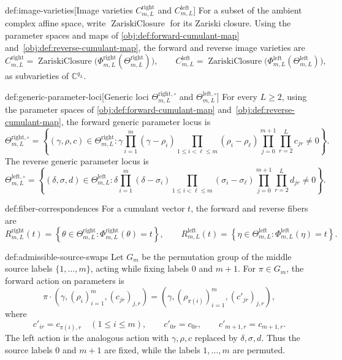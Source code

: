 \begin{definitionv}{def:image-varieties}[Image varieties \(C^{\mathrm{right}}_{m,L}\) and \(C^{\mathrm{left}}_{m,L}\)]
For a subset of the ambient complex affine space, write \(\operatorname{ZariskiClosure}\) for its Zariski closure. Using the parameter spaces and maps of \cref{obj:def:forward-cumulant-map} and~\cref{obj:def:reverse-cumulant-map}, the forward and reverse image varieties are
\[
C^{\mathrm{right}}_{m,L}
=
\operatorname{ZariskiClosure}
\bigl(\Phi^{\mathrm{right}}_{m,L}(\Theta^{\mathrm{right}}_{m,L})\bigr),
\qquad
C^{\mathrm{left}}_{m,L}
=
\operatorname{ZariskiClosure}
\bigl(\Phi^{\mathrm{left}}_{m,L}(\Theta^{\mathrm{left}}_{m,L})\bigr),
\]
as subvarieties of \(\mathbb C^{q_L}\).
\end{definitionv}

\begin{definitionv}{def:generic-parameter-loci}[Generic loci \(\Theta^{\mathrm{right},\circ}_{m,L}\) and \(\Theta^{\mathrm{left},\circ}_{m,L}\)]
For every \(L\ge2\), using the parameter spaces of \cref{obj:def:forward-cumulant-map} and~\cref{obj:def:reverse-cumulant-map}, the forward generic parameter locus is
\[
\Theta^{\mathrm{right},\circ}_{m,L}
=
\left\{
(\gamma,\rho,c)\in \Theta^{\mathrm{right}}_{m,L}:
\gamma
\prod_{i=1}^m(\gamma-\rho_i)
\prod_{1\le i<\ell\le m}(\rho_i-\rho_\ell)
\prod_{j=0}^{m+1}\prod_{r=2}^L c_{jr}
\ne 0
\right\}.
\]
The reverse generic parameter locus is
\[
\Theta^{\mathrm{left},\circ}_{m,L}
=
\left\{
(\delta,\sigma,d)\in \Theta^{\mathrm{left}}_{m,L}:
\delta
\prod_{i=1}^m(\delta-\sigma_i)
\prod_{1\le i<\ell\le m}(\sigma_i-\sigma_\ell)
\prod_{j=0}^{m+1}\prod_{r=2}^L d_{jr}
\ne 0
\right\}.
\]
\end{definitionv}

\begin{definitionv}{def:fiber-correspondences}
For a cumulant vector \(t\), the forward and reverse fibers are
\[
R^{\mathrm{right}}_{m,L}(t)
=
\left\{
\theta\in \Theta^{\mathrm{right}}_{m,L}:
\Phi^{\mathrm{right}}_{m,L}(\theta)=t
\right\},
\qquad
R^{\mathrm{left}}_{m,L}(t)
=
\left\{
\eta\in \Theta^{\mathrm{left}}_{m,L}:
\Phi^{\mathrm{left}}_{m,L}(\eta)=t
\right\}.
\]
\end{definitionv}

\begin{definitionv}{def:admissible-source-swaps}
Let \(G_m\) be the permutation group of the middle source labels \(\{1,\ldots,m\}\), acting while fixing labels \(0\) and \(m+1\). For \(\pi\in G_m\), the forward action on parameters is
\[
\pi\cdot(\gamma,(\rho_i)_{i=1}^m,(c_{jr})_{j,r})
=
(\gamma,(\rho_{\pi(i)})_{i=1}^m,(c'_{jr})_{j,r}),
\]
where
\[
c'_{ir}=c_{\pi(i),r}\quad(1\le i\le m),\qquad
c'_{0r}=c_{0r},\qquad
c'_{m+1,r}=c_{m+1,r}.
\]
The left action is the analogous action with \(\gamma,\rho,c\) replaced by \(\delta,\sigma,d\). Thus the source labels \(0\) and \(m+1\) are fixed, while the labels \(1,\ldots,m\) are permuted.
\end{definitionv}

